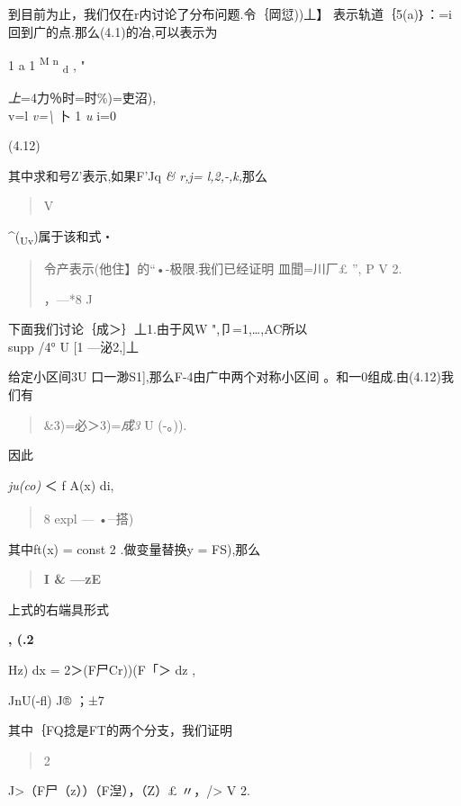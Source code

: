 到目前为止，我们仅在r内讨论了分布问题.令｛岡愆))丄】
表示轨道｛5(a)｝：=i回到广的点.那么(4.1)的冶,可以表示为

1 a 1 \textsuperscript{M n} \textsubscript{d} , "

\emph{上}=4力％时=时\%)=吏沼),\\
v=l \emph{v=\textbackslash{}} 卜 1 \emph{u} i=0

(4.12)

其中求和号Z'表示,如果F'Jq \emph{\& r,j= l,2,-,k,}那么

\begin{quote}
V
\end{quote}

\^{}(\textsubscript{Uv})属于该和式・

\begin{quote}
令产表示(他住】的``•-极限.我们已经证明 皿聞=川厂£ '', P V 2.

，---*8 J
\end{quote}

下面我们讨论｛成＞｝丄1.由于风W ",卩=1,\ldots{},AC所以\\
supp /4° U {[}1 ---泌2,{]}丄

给定小区间3U 口一渺S1{]},那么F-4由广中两个对称小区间
。和一0组成.由(4.12)我们有

\begin{quote}
\&3)=必＞3)=\emph{成3} U (-。)).
\end{quote}

因此

\emph{ju(co)} ＜ f A(x) di,

\begin{quote}
8 expl --- •\textbar{}\textsuperscript{\_}搭)
\end{quote}

其中ft(x) = const 2 .做变量替换y = FS),那么

\begin{quote}
\textbf{I \& ---z\textbar{}E}
\end{quote}

上式的右端具形式

\textbf{, (.2}

Hz) dx = 2＞(F尸Cr))(F「＞ dz ,

JnU(-fl) J® ；±7

其中｛FQ捻是FT的两个分支，我们证明

\begin{quote}
2
\end{quote}

J\textgreater{}（F尸（z））（F湼），（Z）£ 〃，/\textgreater{} V 2.


